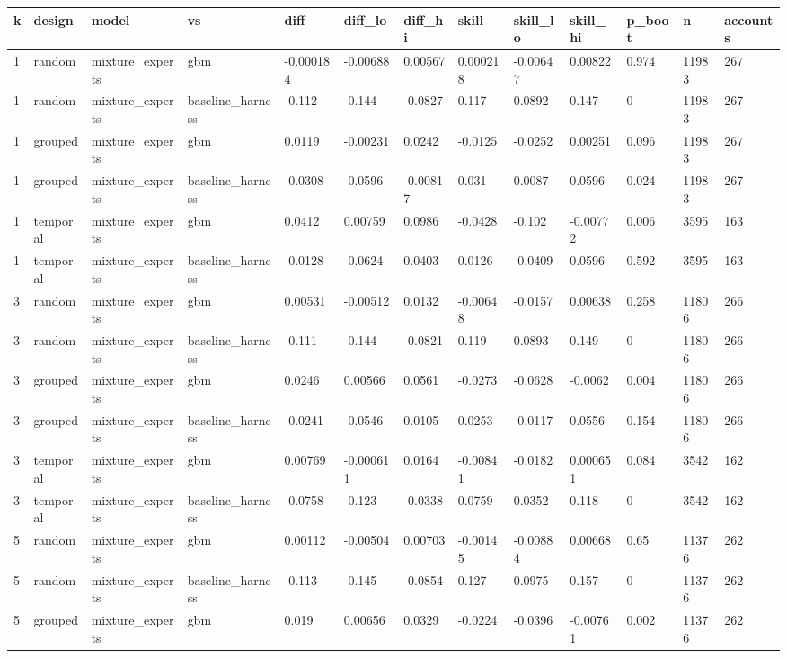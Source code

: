 \begin{tabular}{lllllllllllll}
\toprule
k & design & model & vs & diff & diff\_lo & diff\_hi & skill & skill\_lo & skill\_hi & p\_boot & n & accounts \\
\midrule
1 & random & mixture\_experts & gbm & -0.000184 & -0.00688 & 0.00567 & 0.000218 & -0.00647 & 0.00822 & 0.974 & 11983 & 267 \\
1 & random & mixture\_experts & baseline\_harness & -0.112 & -0.144 & -0.0827 & 0.117 & 0.0892 & 0.147 & 0 & 11983 & 267 \\
1 & grouped & mixture\_experts & gbm & 0.0119 & -0.00231 & 0.0242 & -0.0125 & -0.0252 & 0.00251 & 0.096 & 11983 & 267 \\
1 & grouped & mixture\_experts & baseline\_harness & -0.0308 & -0.0596 & -0.00817 & 0.031 & 0.0087 & 0.0596 & 0.024 & 11983 & 267 \\
1 & temporal & mixture\_experts & gbm & 0.0412 & 0.00759 & 0.0986 & -0.0428 & -0.102 & -0.00772 & 0.006 & 3595 & 163 \\
1 & temporal & mixture\_experts & baseline\_harness & -0.0128 & -0.0624 & 0.0403 & 0.0126 & -0.0409 & 0.0596 & 0.592 & 3595 & 163 \\
3 & random & mixture\_experts & gbm & 0.00531 & -0.00512 & 0.0132 & -0.00648 & -0.0157 & 0.00638 & 0.258 & 11806 & 266 \\
3 & random & mixture\_experts & baseline\_harness & -0.111 & -0.144 & -0.0821 & 0.119 & 0.0893 & 0.149 & 0 & 11806 & 266 \\
3 & grouped & mixture\_experts & gbm & 0.0246 & 0.00566 & 0.0561 & -0.0273 & -0.0628 & -0.0062 & 0.004 & 11806 & 266 \\
3 & grouped & mixture\_experts & baseline\_harness & -0.0241 & -0.0546 & 0.0105 & 0.0253 & -0.0117 & 0.0556 & 0.154 & 11806 & 266 \\
3 & temporal & mixture\_experts & gbm & 0.00769 & -0.000611 & 0.0164 & -0.00841 & -0.0182 & 0.000651 & 0.084 & 3542 & 162 \\
3 & temporal & mixture\_experts & baseline\_harness & -0.0758 & -0.123 & -0.0338 & 0.0759 & 0.0352 & 0.118 & 0 & 3542 & 162 \\
5 & random & mixture\_experts & gbm & 0.00112 & -0.00504 & 0.00703 & -0.00145 & -0.00884 & 0.00668 & 0.65 & 11376 & 262 \\
5 & random & mixture\_experts & baseline\_harness & -0.113 & -0.145 & -0.0854 & 0.127 & 0.0975 & 0.157 & 0 & 11376 & 262 \\
5 & grouped & mixture\_experts & gbm & 0.019 & 0.00656 & 0.0329 & -0.0224 & -0.0396 & -0.00761 & 0.002 & 11376 & 262 \\

\end{tabular}
